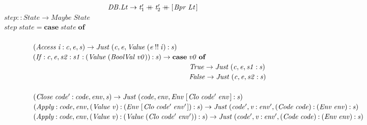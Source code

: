 \documentclass[10pt]{article}
\newcommand{\Conid}[1]{\mathit{#1}}
\newcommand{\Varid}[1]{\mathit{#1}}
\newcommand{\plus}{\mathbin{+\!\!\!+}}
\begin{document}
\begin{hscode}
${\phantom{\Varid{compile}\;\mbox{}}\hskip8.00em\relax\hskip1.50em\relax\hskip1.50em\relax\Conid{\Conid{DB}.Lt}\to \Varid{t}_{1}'\plus \Varid{t}_{2}'\plus [\mskip1.5mu \Conid{Bpr}\;\Conid{Lt}\mskip1.5mu]}$\\
${\Varid{step}\mathbin{::}\Conid{State}\to \Conid{Maybe}\;\Conid{State}}$\\
${\Varid{step}\;\Varid{state}\mathrel{=}\mathbf{case}\;\Varid{state}\;\mathbf{of}}$\\
${}$\\
${\hskip4.00em\relax(\Conid{Access}\;\Varid{i}\mathbin{:}\Varid{c},\Varid{e},\Varid{s})\to \Conid{Just}\;(\Varid{c},\Varid{e},\Conid{Value}\;(\Varid{e}\mathbin{!!}\Varid{i})\mathbin{:}\Varid{s})}$\\
${\hskip4.00em\relax(\Conid{If}\mathbin{:}\Varid{c},\Varid{e},\Varid{s2}\mathbin{:}\Varid{s1}\mathbin{:}(\Conid{Value}\;(\Conid{BoolVal}\;\Varid{v0}))\mathbin{:}\Varid{s})\to \mathbf{case}\;\Varid{v0}\;\mathbf{of}}$\\
${\hskip4.00em\relax\phantom{(\Conid{If}\mathbin{:}\Varid{c},\Varid{e},\Varid{s2}\mathbin{:}\Varid{s1}\mathbin{:}(\Conid{Value}\;(\Conid{BoolVal}\;\Varid{v0}))\mathbin{:}\Varid{s})\to \mathbf{case}\;\mbox{}}\Conid{True}\to \Conid{Just}\;(\Varid{c},\Varid{e},\Varid{s1}\mathbin{:}\Varid{s})}$\\
${\hskip4.00em\relax\phantom{(\Conid{If}\mathbin{:}\Varid{c},\Varid{e},\Varid{s2}\mathbin{:}\Varid{s1}\mathbin{:}(\Conid{Value}\;(\Conid{BoolVal}\;\Varid{v0}))\mathbin{:}\Varid{s})\to \mathbf{case}\;\mbox{}}\Conid{False}\to \Conid{Just}\;(\Varid{c},\Varid{e},\Varid{s2}\mathbin{:}\Varid{s})}$\\
${}$\\
${\hskip4.00em\relax(\Conid{Close}\;\Varid{code'}\mathbin{:}\Varid{code},\Varid{env},\Varid{s})\to \Conid{Just}\;(\Varid{code},\Varid{env},\Conid{Env}\;[\mskip1.5mu \Conid{Clo}\;\Varid{code'}\;\Varid{env}\mskip1.5mu]\mathbin{:}\Varid{s})}$\\
${\hskip4.00em\relax(\Conid{Apply}\mathbin{:}\Varid{code},\Varid{env},(\Conid{Value}\;\Varid{v})\mathbin{:}(\Conid{Env}\;[\mskip1.5mu \Conid{Clo}\;\Varid{code'}\;\Varid{env'}\mskip1.5mu])\mathbin{:}\Varid{s})\to \Conid{Just}\;(\Varid{code'},\Varid{v}\mathbin{:}\Varid{env'},(\Conid{Code}\;\Varid{code})\mathbin{:}(\Conid{Env}\;\Varid{env})\mathbin{:}\Varid{s})}$\\
${\hskip4.00em\relax(\Conid{Apply}\mathbin{:}\Varid{code},\Varid{env},(\Conid{Value}\;\Varid{v})\mathbin{:}(\Conid{Value}\;(\Conid{Clo}\;\Varid{code'}\;\Varid{env'}))\mathbin{:}\Varid{s})\to \Conid{Just}\;(\Varid{code'},\Varid{v}\mathbin{:}\Varid{env'},(\Conid{Code}\;\Varid{code})\mathbin{:}(\Conid{Env}\;\Varid{env})\mathbin{:}\Varid{s})}$\\

\end{hscode}
\end{document}

